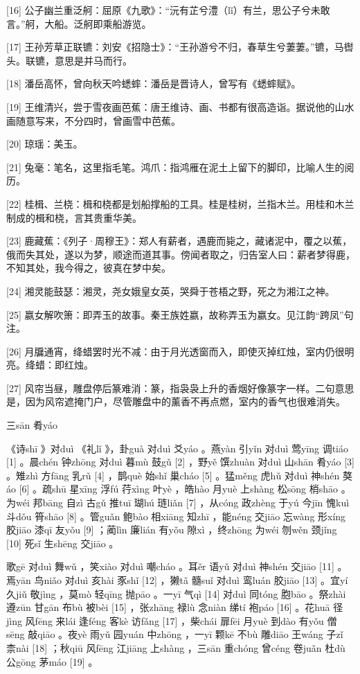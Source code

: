 \documentclass[12pt,UTF8]{ctexbook}
\begin{document}
[16] 公子幽兰重泛舸：屈原《九歌》：“沅有芷兮澧（lǐ）有兰，思公子兮未敢言。”舸，大船。泛舸即乘船游览。

[17] 王孙芳草正联镳：刘安《招隐士》：“王孙游兮不归，春草生兮萋萋。”镳，马辔头。联镳，意思是并马而行。

[18] 潘岳高怀，曾向秋天吟蟋蟀：潘岳是晋诗人，曾写有《蟋蟀赋》。

[19] 王维清兴，尝于雪夜画芭蕉：唐王维诗、画、书都有很高造诣。据说他的山水画随意写来，不分四时，曾画雪中芭蕉。

[20] 琼瑶：美玉。

[21] 兔毫：笔名，这里指毛笔。鸿爪：指鸿雁在泥土上留下的脚印，比喻人生的阅历。

[22] 桂楫、兰桡：楫和桡都是划船撑船的工具。桂是桂树，兰指木兰。用桂和木兰制成的楫和桡，言其贵重华美。

[23] 鹿藏蕉：《列子·周穆王》：郑人有薪者，遇鹿而毙之，藏诸泥中，覆之以蕉，俄而失其处，遂以为梦，顺途而道其事。傍闻者取之，归告室人曰：薪者梦得鹿，不知其处，我今得之，彼真在梦中矣。

[24] 湘灵能鼓瑟：湘灵，尧女娥皇女英，哭舜于苍梧之野，死之为湘江之神。

[25] 嬴女解吹箫：即弄玉的故事。秦王族姓嬴，故称弄玉为嬴女。见江韵“跨凤”句注。

[26] 月牖通宵，绛蜡罢时光不减：由于月光透窗而入，即使灭掉红烛，室内仍很明亮。绛蜡：即红烛。

[27] 风帘当昼，雕盘停后篆难消：篆，指袅袅上升的香烟好像篆字一样。二句意思是，因为风帘遮掩门户，尽管雕盘中的薰香不再点燃，室内的香气也很难消失。





三sān 肴yáo


《诗shī 》对duì 《礼lǐ 》，卦guà 对duì 爻yáo 。燕yàn 引yǐn 对duì 莺yīng 调tiáo [1] 。晨chén 钟zhōng 对duì 暮mù 鼓gǔ [2] ，野yě 馔zhuàn 对duì 山shān 肴yáo [3] 。雉zhì 方fāng 乳rǔ [4] ，鹊què 始shǐ 巢cháo [5] 。猛měng 虎hǔ 对duì 神shén 獒áo [6] 。疏shū 星xīng 浮fú 荇xìng 叶yè ，皓hào 月yuè 上shàng 松sōng 梢shāo 。为wéi 邦bāng 自zì 古gǔ 推tuī 瑚hú 琏liǎn [7] ，从cóng 政zhèng 于yú 今jīn 愧kuì 斗dǒu 筲shāo [8] 。管guǎn 鲍bào 相xiāng 知zhī ，能néng 交jiāo 忘wàng 形xíng 胶jiāo 漆qī 友yǒu [9] ；蔺lìn 廉lián 有yǒu 隙xì ，终zhōng 为wéi 刎wěn 颈jǐng [10] 死sǐ 生shēng 交jiāo 。

歌gē 对duì 舞wǔ ，笑xiào 对duì 嘲cháo 。耳ěr 语yǔ 对duì 神shén 交jiāo [11] 。焉yān 鸟niǎo 对duì 亥hài 豕shǐ [12] ，獭tǎ 髓suǐ 对duì 鸾luán 胶jiāo [13] 。宜yí 久jiǔ 敬jìng ，莫mò 轻qīng 抛pāo 。一yī 气qì [14] 对duì 同tóng 胞bāo 。祭zhài 遵zūn 甘gān 布bù 被bèi [15] ，张zhāng 禄lù 念niàn 绨tí 袍páo [16] 。花huā 径jìng 风fēng 来lái 逢féng 客kè 访fǎng [17] ，柴chái 扉fēi 月yuè 到dào 有yǒu 僧sēng 敲qiāo 。夜yè 雨yǔ 园yuán 中zhōng ，一yī 颗kē 不bù 雕diāo 王wáng 子zǐ 柰nài [18] ；秋qiū 风fēng 江jiāng 上shàng ，三sān 重chóng 曾céng 卷juǎn 杜dù 公gōng 茅máo [19] 。
\end{document}
